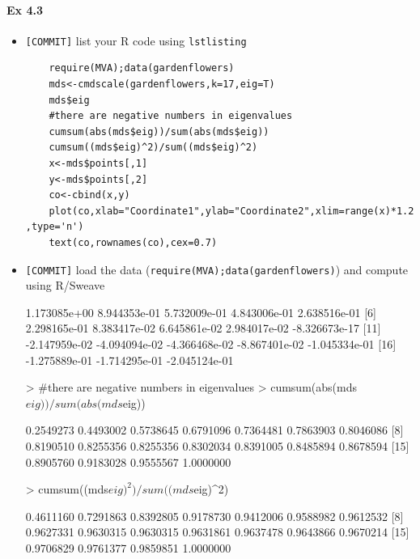 \documentclass[12pt]{article}
\begin{document}
\paragraph{Ex 4.3}
\begin{itemize}
    \item \verb+[COMMIT]+ list your R code using \verb+lstlisting+ 
    \begin{lstlisting}
    require(MVA);data(gardenflowers)
    mds<-cmdscale(gardenflowers,k=17,eig=T)
    mds$eig
    #there are negative numbers in eigenvalues
    cumsum(abs(mds$eig))/sum(abs(mds$eig))
    cumsum((mds$eig)^2)/sum((mds$eig)^2)
    x<-mds$points[,1]
    y<-mds$points[,2]
    co<-cbind(x,y)
    plot(co,xlab="Coordinate1",ylab="Coordinate2",xlim=range(x)*1.2  ,type='n')
    text(co,rownames(co),cex=0.7)
    \end{lstlisting}
    \item \verb+[COMMIT]+ load the data
        (\verb+require(MVA);data(gardenflowers)+) and compute using R/Sweave
\begin{Schunk}
\begin{Soutput}
 [1]  1.173085e+00  8.944353e-01  5.732009e-01  4.843006e-01  2.638516e-01
 [6]  2.298165e-01  8.383417e-02  6.645861e-02  2.984017e-02 -8.326673e-17
[11] -2.147959e-02 -4.094094e-02 -4.366468e-02 -8.867401e-02 -1.045334e-01
[16] -1.275889e-01 -1.714295e-01 -2.045124e-01
\end{Soutput}
\begin{Sinput}
>     #there are negative numbers in eigenvalues
>     cumsum(abs(mds$eig))/sum(abs(mds$eig))
\end{Sinput}
\begin{Soutput}
 [1] 0.2549273 0.4493002 0.5738645 0.6791096 0.7364481 0.7863903 0.8046086
 [8] 0.8190510 0.8255356 0.8255356 0.8302034 0.8391005 0.8485894 0.8678594
[15] 0.8905760 0.9183028 0.9555567 1.0000000
\end{Soutput}
\begin{Sinput}
>     cumsum((mds$eig)^2)/sum((mds$eig)^2)
\end{Sinput}
\begin{Soutput}
 [1] 0.4611160 0.7291863 0.8392805 0.9178730 0.9412006 0.9588982 0.9612532
 [8] 0.9627331 0.9630315 0.9630315 0.9631861 0.9637478 0.9643866 0.9670214
[15] 0.9706829 0.9761377 0.9859851 1.0000000
\end{Soutput}
\end{Schunk}


\end{itemize}
\end{document}
